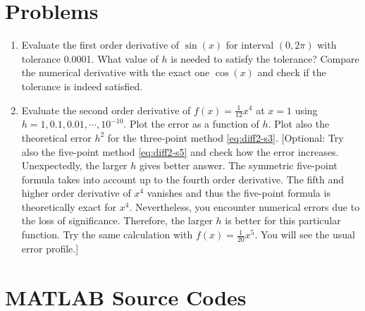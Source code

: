 \vspace{18px}



\noindent
\section*{Problems}

\begin{enumerate}[labelwidth=0.5cm,labelindent=0cm,leftmargin=*,label=\bfseries \thechapter.\arabic*,align=left]
	
\item Evaluate the first order derivative of $\sin(x)$ for interval $(0,2\pi)$ with tolerance 0.0001. What value of $h$ is needed to satisfy the tolerance?  Compare the numerical derivative with the exact one $\cos(x)$ and check if the tolerance is indeed satisfied. 
\item Evaluate the second order derivative of $f(x)=\displaystyle\frac{1}{12} x^4$ at $x=1$ using $h=1, 0.1, 0.01, \cdots, 10^{-10}$.
Plot the error as a function of $h$. Plot also the theoretical error $h^2$ for the three-point method \eqref{eq:diff2-s3}. [Optional: Try also the five-point method \eqref{eq:diff2-s5} and check how the error increases.  Unexpectedly, the larger $h$ gives better answer.  The symmetric five-point formula takes into account up to the fourth order derivative. The fifth and higher order derivative of $x^4$ vanishes and thus the five-point formula is theoretically exact for $x^4$.  Nevertheless, you encounter numerical errors due to the loss of significance.  Therefore, the larger $h$ is better for this particular function.  Try the same calculation with $f(x)=\displaystyle\frac{1}{20}x^5$. You will see the usual error profile.]
%
\end{enumerate}

\vspace{1 in}
\bigskip
\noindent
\section*{MATLAB Source Codes}
\setcounter{program}{0}

\bigskip
\noindent
\program\label{prog:derivative}

